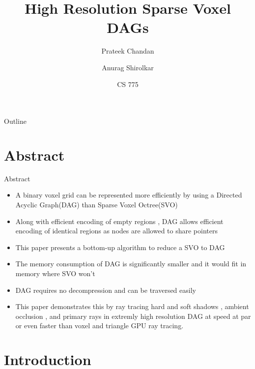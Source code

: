 \documentclass{beamer}
\title{High Resolution Sparse Voxel DAGs}
\author{Prateek Chandan \and Anurag Shirolkar}
\institute[IIT Bombay] %
{
  \inst{}%
  Department of Computer Science\\
  IIT Bombay
}
\date{CS 775}
\begin{document}
\begin{frame}
  \titlepage
\end{frame}

\begin{frame}{Outline}
  \tableofcontents
\end{frame}

\section{Abstract}

	\begin{frame}{Abstract}
	\begin{itemize}
		\item {
		A binary voxel grid can be represented more efficiently by using a Directed Acyclic Graph(DAG) than Sparse Voxel Octree(SVO)
		}
		\item {
			Along with efficient encoding of empty regions , DAG allows efficient encoding of identical regions as nodes are allowed to share pointers
		}
		\item {
			This paper presents a bottom-up algorithm to reduce a SVO to DAG
		}
		\item {
			The memory consumption of DAG is significantly smaller and it would fit in memory where SVO won't
		}
		\item {
			DAG requires no decompression and can be traversed easily
		}
		\item {
			This paper demonstrates this by ray tracing hard and soft shadows , ambient occlusion , and primary rays in extremly high resolution DAG at speed at par or even faster than voxel and triangle GPU ray tracing.
		}
	\end{itemize}
\end{frame}

\section{Introduction}
\end{document}
